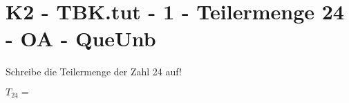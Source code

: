 \section{K2 - TBK.tut - 1 - Teilermenge 24 - OA - QueUnb}

\begin{beispiel}{1} %
				Schreibe die Teilermenge der Zahl 24 auf!\leer
				
				$T_{24}=$ 
\end{beispiel}